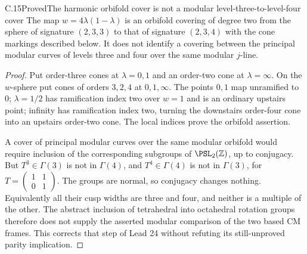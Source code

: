 \begin{statement}{C.15}{Proved}{The harmonic orbifold cover is not a modular level-three-to-level-four cover}
The map $w=4\lambda(1-\lambda)$ is an orbifold covering of degree
two from the sphere of signature $(2,3,3)$ to that of signature
$(2,3,4)$ with the cone markings described below. It does not
identify a covering between the principal modular curves of levels
three and four over the same modular $j$-line.
\end{statement}
\begin{proof}
Put order-three cones at $\lambda=0,1$ and an order-two cone at
$\lambda=\infty$. On the $w$-sphere put cones of orders $3,2,4$
at $0,1,\infty$. The points $0,1$ map unramified to $0$;
$\lambda=1/2$ has ramification index two over $w=1$ and is an
ordinary upstairs point; infinity has ramification index two,
turning the downstairs order-four cone into an upstairs order-two
cone. The local indices prove the orbifold assertion.

A cover of principal modular curves over the same modular orbifold
would require inclusion of the corresponding subgroups of
$\PSL_2(\mathbb Z)$, up to conjugacy. But $T^3\in\Gamma(3)$
is not in $\Gamma(4)$, and $T^4\in\Gamma(4)$ is not in
$\Gamma(3)$, for $T=\left(\begin{smallmatrix}1&1\\0&1\end{smallmatrix}\right)$.
The groups are normal, so conjugacy changes nothing. Equivalently
all their cusp widths are three and four, and neither is a multiple
of the other. The abstract inclusion of tetrahedral into octahedral
rotation groups therefore does not supply the asserted modular
comparison of the two based CM frames. This corrects that step
of Lead 24 without refuting its still-unproved parity implication.
\end{proof}

